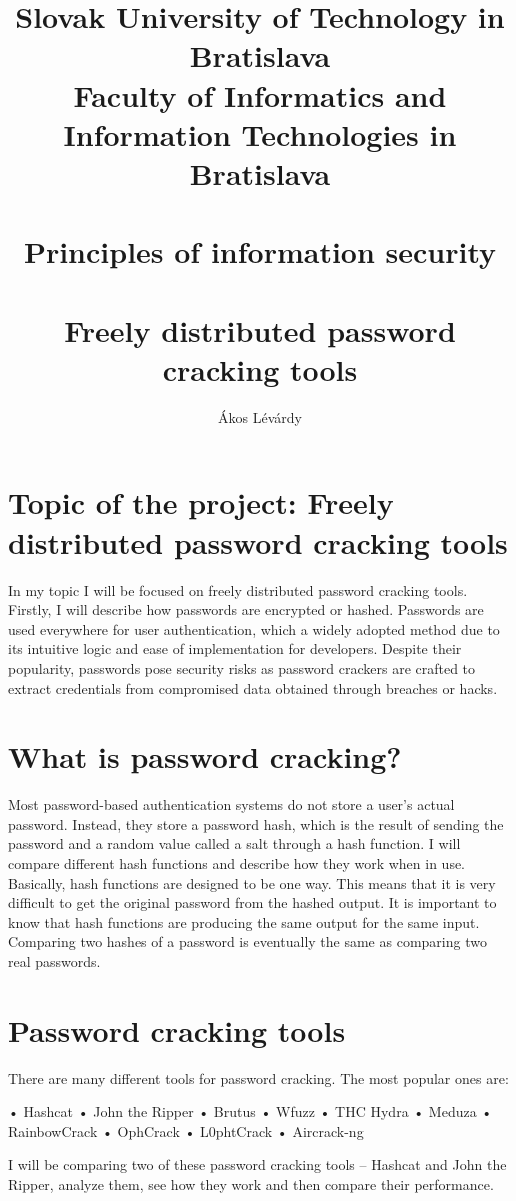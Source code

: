 \documentclass[10pt,oneside,english,a4paper]{article}
\title{\huge \textbf{Slovak University of Technology in Bratislava
\\Faculty of Informatics and Information Technologies in Bratislava}\\
\ \\
Principles of information security\\
\ \\
Freely distributed password cracking tools}
\author{Ákos Lévárdy}
\begin{document}
\maketitle

\pagebreak

\tableofcontents

\pagebreak

\section{Topic of the project: Freely distributed password cracking tools}
In my topic I will be focused on freely distributed password cracking tools. Firstly, I will describe how passwords are encrypted or hashed. Passwords are used everywhere for user authentication, which a widely adopted method due to its intuitive logic and ease of implementation for developers. Despite their popularity, passwords pose security risks as password crackers are crafted to extract credentials from compromised data obtained through breaches or hacks.

\section{What is password cracking?}
Most password-based authentication systems do not store a user’s actual password. Instead, they store a password hash, which is the result of sending the password and a random value called a salt through a hash function.
I will compare different hash functions and describe how they work when in use. Basically, hash functions are designed to be one way. This means that it is very difficult to get the original password from the hashed output. It is important to know that hash functions are producing the same output for the same input. Comparing two hashes of a password is eventually the same as comparing two real passwords.


\section{Password cracking tools}
There are many different tools for password cracking. The most popular ones are: 

•	Hashcat
•	John the Ripper
•	Brutus
•	Wfuzz
•	THC Hydra
•	Meduza
•	RainbowCrack
•	OphCrack
•	L0phtCrack
•	Aircrack-ng


I will be comparing two of these password cracking tools – Hashcat and John the Ripper, analyze them, see how they work and then compare their performance. 
\end{document}

